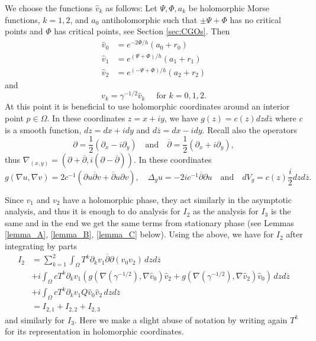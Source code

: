 \documentclass[a4paper, 10pt, twoside, notitlepage]{amsart}
\theoremstyle{plain}
\newcommand{\Om}{\Omega}
\numberwithin{equation}{section}
\newcommand {\p} {\partial}
\newcommand{\dbar}{\ol{\p}}
\newcommand{\ol}[1]{\overline{#1}}
\newcommand{\oz}{\overline{z}}
\begin{document}
We choose the functions $\hat{v}_k$ as follows: Let $\Psi, \Phi, a_k$ be holomorphic Morse functions, $k=1,2$, and $a_0$ antiholomorphic such that $\pm\Psi + \Phi$ has no critical points and $\Phi$ has critical points, see Section \ref{sec:CGOs}. Then
\begin{align*}
	\hat{v}_0 &= e^{-2\ol{\Phi}/h}(a_0 + r_0)\\
	\hat{v}_1 &= e^{(\Psi+\Phi)/h}(a_1 + r_1)\\
	\hat{v}_2 &= e^{(-\Psi+\Phi)/h}(a_2 + r_2)
\end{align*}
and
\begin{equation*}
	v_k = \gamma^{-1/2}\hat{v}_k\quad\text{ for } k=0,1,2.
\end{equation*}
At this point it is beneficial to use holomorphic coordinates around an interior point $p\in\Om$. In these coordinates $z=x+iy$, we have $g(z)=c(z)dzd\oz$ where $c$ is a smooth function, $dz=dx+idy$ and $d\oz=dx-idy$. Recall also the operators
\begin{equation}\label{doo_doobar}
	\p = \frac{1}{2}(\p_x - i\p_y)\quad \text{and}\quad \ol{\p} = \frac{1}{2}(\p_x + i\p_y),
\end{equation}
thus $\nabla_{(x,y)}=(\p+\ol{\p},i(\p-\ol{\p}))$.
In these coordinates
\begin{equation}\label{holomorp_coord}
	g(\nabla u,\nabla v)=2c^{-1}(\p u\dbar v + \dbar u\p v),\quad\Delta_gu = -2ic^{-1}\ol{\p}\p u\quad\text{and}\quad dV_g=c(z)\frac{i}{2}dzd\oz.
\end{equation}

Since $v_1$ and $v_2$ have a holomorphic phase, they act similarly in the asymptotic analysis, and thus it is enough to do analysis for $I_2$ as the analysis for $I_3$ is the same and in the end we get the same terms from stationary phase (see Lemmas \ref{lemma_A}, \ref{lemma_B}, \ref{lemma_C} below). Using the above, we have for $I_2$ after integrating by parts
\begin{align*}
	I_2 &= \sum_{k=1}^2 \int_{\Om}T^k\p_k v_1 \ol{\p}\p(v_0v_2)\,dzd\oz\\
	&+ i\int_{\Om} cT^k \p_k v_1 \left(g\left(\nabla(\gamma^{-1/2}),\nabla \hat{v}_0\right)\hat{v}_2 + g\left(\nabla(\gamma^{-1/2}),\nabla \hat{v}_2\right)\hat{v}_0\right)\,dzd\oz\\
	&+ i\int_{\Om} cT^k\p_kv_1Q\hat{v}_0\hat{v}_2\,dzd\oz\\
	&= I_{2,1} + I_{2,2} + I_{2,3}
\end{align*}
and similarly for $I_3$. Here we make a slight abuse of notation by writing again $T^k$ for its representation in holomorphic coordinates.
\end{document}
